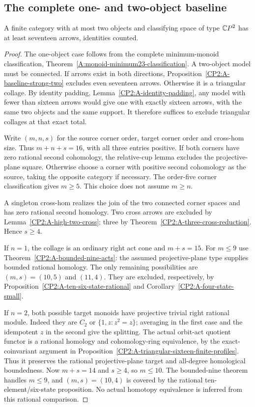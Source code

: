 \subsection{The complete one- and two-object baseline}

\begin{theorem}
\label{CP2:A-two-object-baseline-sixteen}
A finite category with at most two objects and classifying
space of type $\mathbb{C}P^2$ has at least seventeen arrows,
identities counted.
\end{theorem}
\begin{proof}
The one-object case follows from the complete minimum-monoid
classification, Theorem~\ref{A:monoid-minimum23-classification}.
A two-object model must be connected. If arrows exist in
both directions, Proposition~\ref{CP2:A-baseline-strong-two}
excludes even seventeen arrows. Otherwise it is a triangular
collage. By identity padding,
Lemma~\ref{CP2:A-identity-padding}, any model with fewer than
sixteen arrows would give one with exactly sixteen arrows,
with the same two objects and the same support. It therefore
suffices to exclude triangular collages at that exact total.

Write $(m,n,s)$ for the source corner order, target corner
order and cross-hom size. Thus $m+n+s=16$, with all three
entries positive. If both corners have zero rational second
cohomology, the relative-cup lemma excludes the projective-plane
square. Otherwise choose a corner with positive second
cohomology as the source, taking the opposite category if
necessary. The order-five corner classification gives
$m\geq5$. This choice does not assume $m\geq n$.

A singleton cross-hom realizes the join of the two connected
corner spaces and has zero rational second homology.
Two cross arrows are excluded by
Lemma~\ref{CP2:A-high-two-cross}; three by
Theorem~\ref{CP2:A-three-cross-reduction}. Hence $s\geq4$.

If $n=1$, the collage is an ordinary right act cone and
$m+s=15$. For $m\leq9$ use
Theorem~\ref{CP2:A-bounded-nine-acts}: the assumed
projective-plane type supplies bounded rational homology.
The only remaining possibilities are $(m,s)=(10,5)$ and
$(11,4)$. They are excluded, respectively, by
Proposition~\ref{CP2:A-ten-six-state-rational} and
Corollary~\ref{CP2:A-four-state-small}.

If $n=2$, both possible target monoids have projective
trivial right rational module. Indeed they are $C_2$ or
$\{1,z:z^2=z\}$; averaging in the first case and the
idempotent $z$ in the second give the splitting. The actual
orbit-act quotient functor is a rational homology and
cohomology-ring equivalence, by the exact-coinvariant
argument in Proposition~\ref{CP2:A-triangular-sixteen-finite-profiles}.
Thus it preserves the rational projective-plane target and
all-degree homological boundedness. Now $m+s=14$ and
$s\geq4$, so $m\leq10$. The bounded-nine theorem handles
$m\leq9$, and $(m,s)=(10,4)$ is covered by the
rational ten-element/six-state proposition. No actual
homotopy equivalence is inferred from this rational comparison.


\end{proof}
